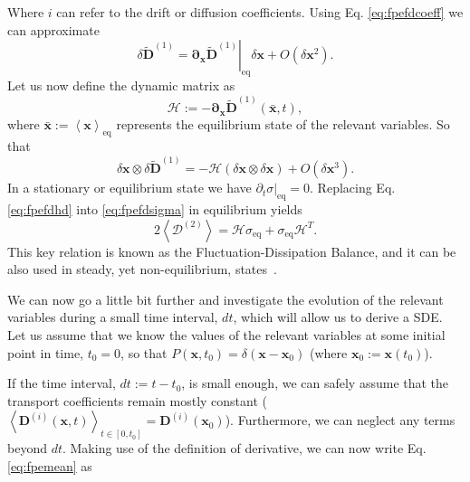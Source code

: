 \documentclass[twoside,openright,titlepage,numbers=noenddot,%
headinclude,footinclude,cleardoublepage=empty,abstract=on,
BCOR=5mm,fontsize=11pt, dvipsnames, paper=b5
]{scrreprt}
\renewcommand{\vec}[1]{\bm{#1}}
\newcommand{\tens}[1]{\bm{\mathcal{#1}}}
\begin{document}
Where $i$ can refer to the drift or diffusion coefficients.
Using Eq. \eqref{eq:fpefdcoeff} we can approximate
\begin{equation}
  \delta\widetilde{\vec{D}}^{(1)} = \left.\vec{\partial}_{\vec{x}}\widetilde{\vec{D}}^{(1)}\right|_{\text{eq}}\delta\vec{x} + O\left(\delta\vec{x}^2\right).
\end{equation}
Let us now define the dynamic matrix as
\begin{equation}
  \tens{H} := -\vec{\partial}_{\vec{x}}\widetilde{\vec{D}}^{(1)}(\bar{\vec{x}},t),  
\end{equation}
where $\bar{\vec{x}}:=\left\langle\vec{x}\right\rangle_{\text{eq}}$ represents the equilibrium state of the relevant variables.
So that
\begin{equation}
  \label{eq:fpefdhd}
  \delta\vec{x}\otimes\delta\widetilde{\vec{D}}^{(1)} = -\tens{H}\left(\delta\vec{x}\otimes\delta\vec{x}\right) + O\left(\delta\vec{x}^3\right).
\end{equation}
In a stationary or equilibrium state we have $\partial_t\left.\tens{\sigma}\right|_{\text{eq}} = 0$. Replacing Eq. \eqref{eq:fpefdhd} into \eqref{eq:fpefdsigma} in equilibrium yields
\begin{equation}
  \label{eq:fpefdbal}
  2\left\langle\tens{D}^{(2)}\right\rangle = \tens{H}\tens{\sigma}_{\text{eq}} + \tens{\sigma}_{\text{eq}}\tens{H}^T.
\end{equation}
This key relation is known as the Fluctuation-Dissipation Balance, and it can be also used in steady, yet non-equilibrium, states~\cite{Zarate2006}.

We can now go a little bit further and investigate the evolution of the relevant variables during a small time interval, $dt$, which will allow us to derive a \gls{SDE}.
Let us assume that we know the values of the relevant variables at some initial point in time, $t_0 = 0$, so that $P(\vec{x}, t_0) = \delta(\vec{x}-\vec{x}_0)$ (where $\vec{x}_0 :=\vec{x}(t_0)$).

If the time interval, $dt := t-t_0$, is small enough, we can safely assume that the transport coefficients remain mostly constant ($\left\langle\vec{D}^{(i)}(\vec{x},t)\right\rangle_{t\in[0,t_0]}=\vec{D}^{(i)}(\vec{x}_0)$). Furthermore, we can neglect any terms beyond $dt$. 
Making use of the definition of derivative, we can now write Eq. \eqref{eq:fpemean} as
\end{document}
